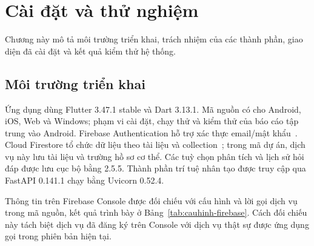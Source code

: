 \chapter{Cài đặt và thử nghiệm}
\label{ch:caidat}

\begin{muctieu}
Chương này mô tả môi trường triển khai, trách nhiệm của các thành phần, giao
diện đã cài đặt và kết quả kiểm thử hệ thống.
\end{muctieu}

\section{Môi trường triển khai}

Ứng dụng  dùng Flutter 3.47.1 stable và Dart 3.13.1.
Mã nguồn có  cho Android, iOS, Web và Windows; phạm vi
cài đặt, chạy thử và kiểm thử của báo cáo tập trung vào Android. Firebase
Authentication hỗ trợ xác thực email/mật khẩu~\cite{FirebaseAuthFlutter}.
Cloud Firestore tổ chức dữ liệu theo tài liệu và collection~\cite{FirestoreDataModel};
trong mã dự án, dịch vụ này lưu tài liệu  và trường hồ sơ cơ thể. Các tuỳ chọn phân tích và lịch
sử hỏi đáp được lưu cục bộ bằng  2.5.5. Thành phần
trí tuệ nhân tạo được truy cập qua FastAPI 0.141.1 chạy bằng Uvicorn 0.52.4.

Thông tin trên Firebase Console được đối chiếu với cấu hình và lời gọi dịch
vụ trong mã nguồn, kết quả trình bày ở Bảng~\ref{tab:cauhinh-firebase}. Cách
đối chiếu này tách biệt dịch vụ đã đăng ký trên Console với dịch vụ thật sự
được ứng dụng gọi trong phiên bản hiện tại.

